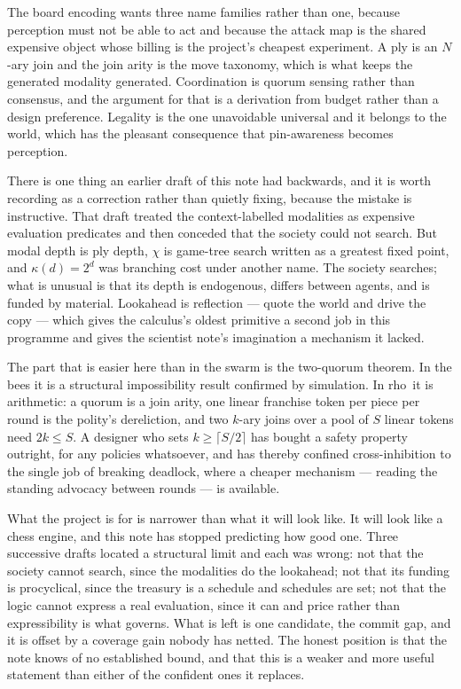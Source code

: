 \documentclass[11pt,a4paper]{article}
\theoremstyle{plain}
\theoremstyle{definition}
\theoremstyle{remark}
\newcommand{\rhoc}{\textsf{rho}}
\begin{document}
The board encoding wants three name families rather than one, because perception
must not be able to act and because the attack map is the shared expensive
object whose billing is the project's cheapest experiment. A ply is an $N$-ary
join and the join arity is the move taxonomy, which is what keeps the generated
modality generated. Coordination is quorum sensing rather than consensus, and the
argument for that is a derivation from budget rather than a design preference.
Legality is the one unavoidable universal and it belongs to the world, which has
the pleasant consequence that pin-awareness becomes perception.

There is one thing an earlier draft of this note had backwards, and it is worth
recording as a correction rather than quietly fixing, because the mistake is
instructive. That draft treated the context-labelled modalities as expensive
evaluation predicates and then conceded that the society could not search. But
modal depth is ply depth, $\chi$ is game-tree search written as a greatest fixed
point, and $\kappa(d) = 2^d$ was branching cost under another name. The society
searches; what is unusual is that its depth is endogenous, differs between
agents, and is funded by material. Lookahead is reflection --- quote the world
and drive the copy --- which gives the calculus's oldest primitive a second job
in this programme and gives the scientist note's imagination a mechanism it
lacked.

The part that is easier here than in the swarm is the two-quorum theorem. In the
bees it is a structural impossibility result confirmed by simulation. In
\rhoc\ it is arithmetic: a quorum is a join arity, one linear franchise token
per piece per round is the polity's dereliction, and two $k$-ary joins over a
pool of $S$ linear tokens need $2k \leq S$. A designer who sets $k \geq
\lceil S/2\rceil$ has bought a safety property outright, for any policies
whatsoever, and has thereby confined cross-inhibition to the single job of
breaking deadlock, where a cheaper mechanism --- reading the standing advocacy
between rounds --- is available.

What the project is for is narrower than what it will look like. It will look
like a chess engine, and this note has stopped predicting how good one. Three
successive drafts located a structural limit and each was wrong: not that the
society cannot search, since the modalities do the lookahead; not that its
funding is procyclical, since the treasury is a schedule and schedules are set;
not that the logic cannot express a real evaluation, since it can and price
rather than expressibility is what governs. What is left is one candidate, the
commit gap, and it is offset by a coverage gain nobody has netted. The honest
position is that the note knows of no established bound, and that this is a
weaker and more useful statement than either of the confident ones it replaces.
\end{document}
